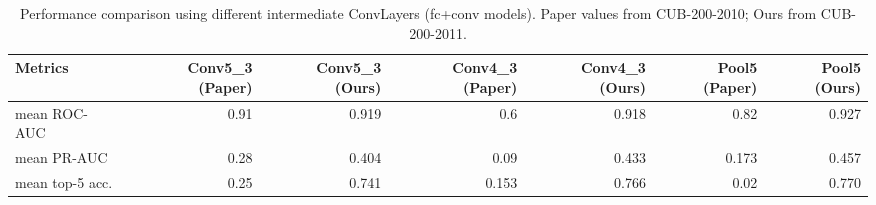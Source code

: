 
\begin{table}[t]
\centering
\scriptsize
\caption{Performance comparison using different intermediate ConvLayers (fc+conv models). Paper values from CUB-200-2010; Ours from CUB-200-2011.}
\label{tab:table3}
\begin{tabular}{lrrrrrr}
\toprule
Metrics & Conv5\_3 (Paper) & Conv5\_3 (Ours) & Conv4\_3 (Paper) & Conv4\_3 (Ours) & Pool5 (Paper) & Pool5 (Ours) \\ \midrule
mean ROC-AUC & 0.91 & 0.919 & 0.6 & 0.918 & 0.82 & 0.927 \\
mean PR-AUC & 0.28 & 0.404 & 0.09 & 0.433 & 0.173 & 0.457 \\
mean top-5 acc. & 0.25 & 0.741 & 0.153 & 0.766 & 0.02 & 0.770 \\
 \bottomrule
\end{tabular}
\end{table}

